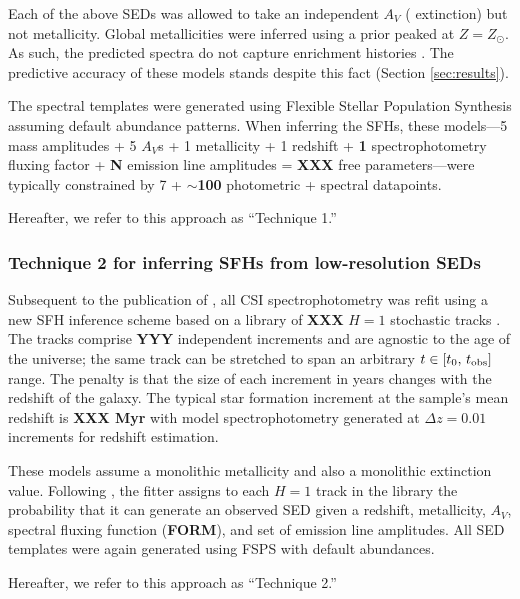 \documentclass[a4paper,fleqn,usenatbib]{mnras}
\newcommand{\bfr}{\bf\color{red}}
\begin{document}
Each of the above SEDs was allowed to take an independent $A_{V}$ (\citealt{Calzetti00} 
extinction) but not metallicity. Global metallicities were inferred using a prior peaked at 
$Z=Z_{\odot}$. As such, the predicted spectra do not capture enrichment histories 
\citep[cf.][]{Pacifici12, Morishita19}. The predictive accuracy of these models stands despite this fact (Section \ref{sec:results}).

The spectral templates were generated using Flexible Stellar Population Synthesis 
\citep[FSPS;][]{ConroyGunnWhite09} assuming default abundance patterns. When inferring the SFHs, 
these models---5 mass amplitudes + 5 $A_{V}$s + 1 metallicity + 1 redshift + {\bfr 1} spectrophotometry fluxing 
factor + {\bfr N} emission line amplitudes = {\bfr XXX} free parameters---were typically constrained by 
7 + {\bfr $\sim$100} photometric + spectral datapoints.

Hereafter, we refer to this approach as ``Technique 1.''

\subsubsection{Technique 2 for inferring SFHs from low-resolution SEDs}
\label{sec:h1}

Subsequent to the publication of \citet{Dressler18}, all CSI spectrophotometry was refit using a new 
SFH inference scheme based on a library of {\bfr XXX} $H=1$ stochastic tracks
\citep{Kelson14,Kelson16,Kelson19}. The tracks comprise {\bfr YYY} independent increments and are 
agnostic to the age of the universe; the same track can be stretched to span an arbitrary 
$t\in[t_{0},\,t_{\rm obs}]$ range. The penalty is that the size of each increment in years changes
with the redshift of the galaxy. The typical star formation increment at the sample's mean redshift 
is {\bfr XXX Myr} with model spectrophotometry generated at {\bfr $\Delta z = 0.01$} increments for
redshift estimation.

These models assume a monolithic metallicity and also a monolithic extinction value. Following 
\citealt{Pacifici12}, the fitter assigns to each $H=1$ track in the library the probability that it can generate
an observed SED given a redshift, metallicity, $A_{V}$, spectral fluxing function ({\bfr FORM}), and 
set of emission line amplitudes. All SED templates were again generated using FSPS with default abundances.

Hereafter, we refer to this approach as ``Technique 2.''
\end{document}
